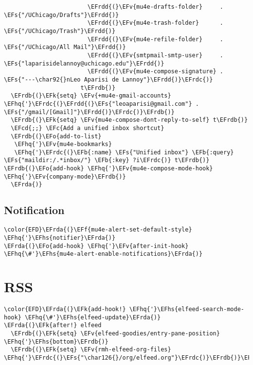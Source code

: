 \documentclass[c]{article}
\theoremstyle{plain}%
\theoremstyle{definition}
\theoremstyle{remark}
\newcommand{\EFc}[1]{\textcolor{EFc}{#1}} %
\newcommand{\EFcd}[1]{\textcolor{EFcd}{#1}} %
\newcommand{\EFs}[1]{\textcolor{EFs}{#1}} %
\newcommand{\EFk}[1]{\textcolor{EFk}{#1}} %
\newcommand{\EFb}[1]{\textcolor{EFb}{#1}} %
\newcommand{\EFf}[1]{\textcolor{EFf}{#1}} %
\newcommand{\EFv}[1]{\textcolor{EFv}{#1}} %
\newcommand{\EFo}[1]{\textcolor{EFo}{#1}} %
\newcommand{\EFhq}[1]{\textcolor{EFhq}{#1}} %
\newcommand{\EFhs}[1]{\textcolor{EFhs}{#1}} %
\newcommand{\EFrda}[1]{\textcolor{EFrda}{#1}} %
\newcommand{\EFrdb}[1]{\textcolor{EFrdb}{#1}} %
\newcommand{\EFrdc}[1]{\textcolor{EFrdc}{#1}} %
\newcommand{\EFrdd}[1]{\textcolor{EFrdd}{#1}} %
\begin{document}
\begin{Code}
\begin{Verbatim}
                        \EFrdd{(}\EFv{mu4e-drafts-folder}     . \EFs{"/UChicago/Drafts"}\EFrdd{)}
                        \EFrdd{(}\EFv{mu4e-trash-folder}      . \EFs{"/UChicago/Trash"}\EFrdd{)}
                        \EFrdd{(}\EFv{mu4e-refile-folder}     . \EFs{"/UChicago/All Mail"}\EFrdd{)}
                        \EFrdd{(}\EFv{smtpmail-smtp-user}     . \EFs{"laparisidelannoy@uchicago.edu"}\EFrdd{)}
                        \EFrdd{(}\EFv{mu4e-compose-signature} . \EFs{"---\char92{}nLeo Aparisi de Lannoy"}\EFrdd{)}\EFrdc{)}
                      t\EFrdb{)}
  \EFrdb{(}\EFk{setq} \EFv{+mu4e-gmail-accounts} \EFhq{'}\EFrdc{(}\EFrdd{(}\EFs{"leoaparisi@gmail.com"} . \EFs{"/gmail/[Gmail]"}\EFrdd{)}\EFrdc{)}\EFrdb{)}
  \EFrdb{(}\EFk{setq} \EFv{mu4e-compose-dont-reply-to-self} t\EFrdb{)}
  \EFcd{;;} \EFc{Add a unified inbox shortcut}
  \EFrdb{(}\EFo{add-to-list}
   \EFhq{'}\EFv{mu4e-bookmarks}
   \EFhq{'}\EFrdc{(}\EFb{:name} \EFs{"Unified inbox"} \EFb{:query} \EFs{"maildir:/.*inbox/"} \EFb{:key} ?i\EFrdc{)} t\EFrdb{)}
\EFrdb{(}\EFo{add-hook} \EFhq{'}\EFv{mu4e-compose-mode-hook} \EFhq{'}\EFv{company-mode}\EFrdb{)}
  \EFrda{)}
\end{Verbatim}
\end{Code}
\subsection{Notification}
\label{sec:org81ebc63}
\begin{Code}
\begin{Verbatim}
\color{EFD}\EFrda{(}\EFf{mu4e-alert-set-default-style} \EFhq{'}\EFhs{notifier}\EFrda{)}
\EFrda{(}\EFo{add-hook} \EFhq{'}\EFv{after-init-hook} \EFhq{\#'}\EFhs{mu4e-alert-enable-notifications}\EFrda{)}
\end{Verbatim}
\end{Code}
\section{RSS}
\label{sec:org60724ce}
\begin{Code}
\begin{Verbatim}
\color{EFD}\EFrda{(}\EFk{add-hook!} \EFhq{'}\EFhs{elfeed-search-mode-hook} \EFhq{\#'}\EFhs{elfeed-update}\EFrda{)}
\EFrda{(}\EFk{after!} elfeed
  \EFrdb{(}\EFk{setq} \EFv{elfeed-goodies/entry-pane-position} \EFhq{'}\EFhs{bottom}\EFrdb{)}
  \EFrdb{(}\EFk{setq} \EFv{rmh-elfeed-org-files} \EFhq{'}\EFrdc{(}\EFs{"\char126{}/org/elfeed.org"}\EFrdc{)}\EFrdb{)}\EFrda{)}
\end{Verbatim}
\end{Code}
\end{document}
